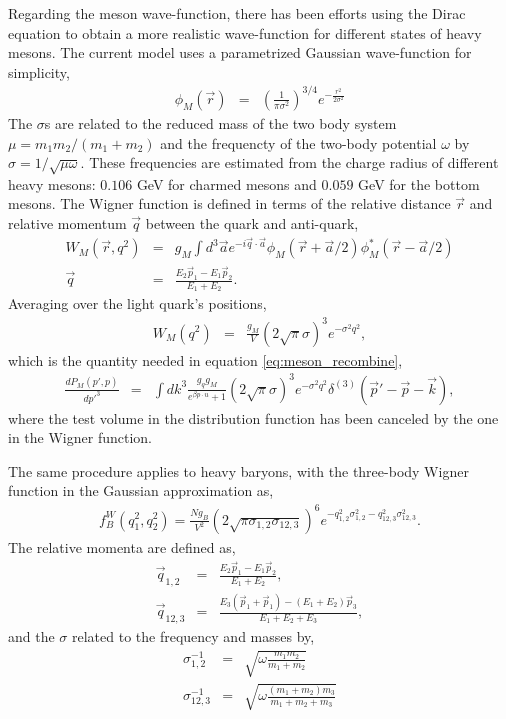 Regarding the meson wave-function, there has been efforts using the Dirac equation to obtain a more realistic wave-function for different states of heavy mesons.
The current model uses a parametrized Gaussian wave-function for simplicity,
\begin{eqnarray}
\phi_M(\vec{r}) &=& \left(\frac{1}{\pi \sigma^2}\right)^{3/4} e^{-\frac{r^2}{2\sigma^2}}
\end{eqnarray}
The $\sigma$s are related to the reduced mass of the two body system $\mu = m_1 m_2/(m_1+m_2)$ and the frequencty of the  two-body potential $\omega$ by $\sigma = 1/\sqrt{\mu \omega}$.
These frequencies are estimated from the charge radius of different heavy mesons: $0.106$ GeV for charmed mesons and $0.059$ GeV for the bottom mesons.
The Wigner function is defined in terms of the relative distance $\vec{r}$ and relative momentum $\vec{q}$ between the quark and anti-quark,
\begin{eqnarray}
W_M(\vec{r}, q^2) &=& g_M \int d^3 \vec{a} e^{-i\vec{q}\cdot \vec{a}} \phi_M(\vec{r}+\vec{a}/2) \phi_M^*(\vec{r}-\vec{a}/2) \\
\vec{q} &=& \frac{E_2\vec{p}_1 - E_1\vec{p}_2}{E_1+E_2}.
\end{eqnarray} 
Averaging over the light quark's positions,
\begin{eqnarray}
W_M(q^2) &=& \frac{g_M}{V} (2\sqrt{\pi}\sigma)^3 e^{-\sigma^2 q^2},
\end{eqnarray}
which is the quantity needed in equation \ref{eq:meson_recombine},
\begin{eqnarray}
\frac{dP_M(p',p)}{dp'^3} &=& \int dk^3 \frac{g_q g_M}{e^{\beta p\cdot u} + 1} (2\sqrt{\pi}\sigma)^3 e^{-\sigma^2 q^2} \delta^{(3)}(\vec{p}'-\vec{p}-\vec{k}),
\end{eqnarray}
where the test volume in the distribution function has been canceled by the one in the Wigner function.

The same procedure applies to heavy baryons, with the three-body Wigner function in the Gaussian approximation as,
\begin{eqnarray}
f_B^W(q_1^2, q_2^2) = \frac{N g_B}{V^2} (2\sqrt{\pi\sigma_{1,2}\sigma_{12,3}})^6 e^{-q_{1,2}^2 \sigma_{1,2}^2 - q_{12,3}^2 \sigma_{12,3}^2}.
\end{eqnarray}
The relative momenta are defined as,
\begin{eqnarray}
\vec{q}_{1,2} &=& \frac{E_2 \vec{p}_1 -E_1\vec{p}_2}{E_1+E_2},\\
\vec{q}_{12,3} &=& \frac{E_3 (\vec{p}_1+\vec{p}_1) - (E_1+E_2)\vec{p}_3}{E_1+E_2 + E_3},
\end{eqnarray}
and the $\sigma$ related to the frequency and masses by,
\begin{eqnarray}
\sigma_{1,2}^{-1} &=& \sqrt{\omega \frac{m_1m_2}{m_1+m_2}}\\
\sigma_{12,3}^{-1} &=& \sqrt{\omega \frac{(m_1+m_2)m_3}{m_1+m_2+m_3}}
\end{eqnarray}

